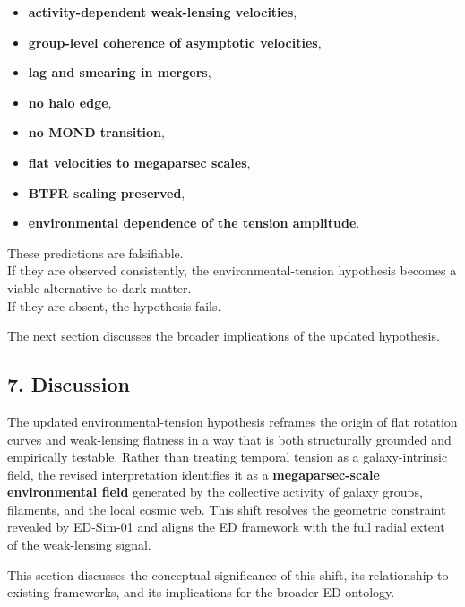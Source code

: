 \begin{itemize}
\tightlist
\item
  \textbf{activity-dependent weak-lensing velocities},\\
\item
  \textbf{group-level coherence of asymptotic velocities},\\
\item
  \textbf{lag and smearing in mergers},\\
\item
  \textbf{no halo edge},\\
\item
  \textbf{no MOND transition},\\
\item
  \textbf{flat velocities to megaparsec scales},\\
\item
  \textbf{BTFR scaling preserved},\\
\item
  \textbf{environmental dependence of the tension amplitude}.
\end{itemize}

These predictions are falsifiable.\\
If they are observed consistently, the environmental-tension hypothesis
becomes a viable alternative to dark matter.\\
If they are absent, the hypothesis fails.

The next section discusses the broader implications of the updated
hypothesis.

\subsection{7. Discussion}\label{discussion}

The updated environmental-tension hypothesis reframes the origin of flat
rotation curves and weak-lensing flatness in a way that is both
structurally grounded and empirically testable. Rather than treating
temporal tension as a galaxy-intrinsic field, the revised interpretation
identifies it as a \textbf{megaparsec-scale environmental field}
generated by the collective activity of galaxy groups, filaments, and
the local cosmic web. This shift resolves the geometric constraint
revealed by ED-Sim-01 and aligns the ED framework with the full radial
extent of the weak-lensing signal.

This section discusses the conceptual significance of this shift, its
relationship to existing frameworks, and its implications for the
broader ED ontology.


